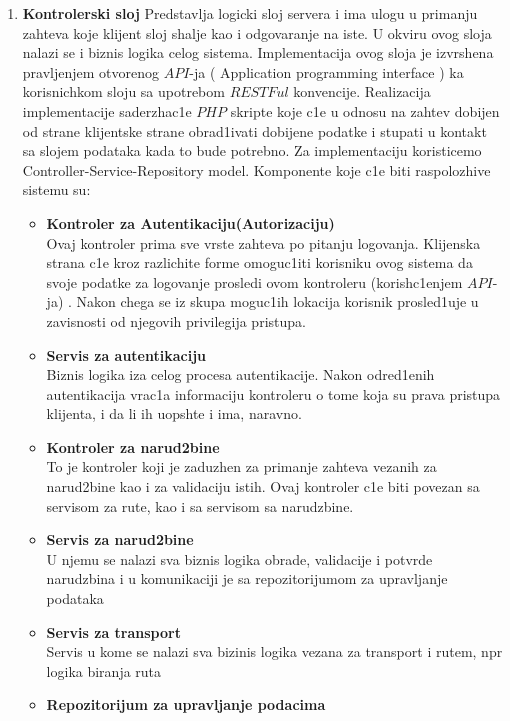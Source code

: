 \begin{enumerate}
    \item {\textbf{Kontrolerski sloj}}
			Predstavlja logicki sloj servera i ima ulogu u primanju zahteva koje klijent sloj shalje kao i odgovaranje na iste. U okviru ovog sloja nalazi se i biznis logika celog sistema.  Implementacija ovog sloja je izvrshena pravljenjem otvorenog $API$-ja ( \selectfont Application programming interface  \selectfont ) ka korisnichkom sloju sa upotrebom $RESTFul$ konvencije. Realizacija implementacije saderzhac1e $PHP$ skripte koje c1e u odnosu na zahtev dobijen od strane klijentske strane obrad1ivati dobijene podatke i stupati u kontakt sa slojem podataka kada to bude potrebno. Za implementaciju koristicemo  \selectfont Controller-Service-Repository \selectfont  model.  Komponente koje c1e biti raspolozhive sistemu su:
			\begin{itemize}
				\item {\textbf{Kontroler za Autentikaciju(Autorizaciju)} \\
						Ovaj kontroler prima sve vrste zahteva po pitanju logovanja. Klijenska strana c1e kroz razlichite forme omoguc1iti korisniku ovog sistema da svoje podatke za logovanje prosledi ovom kontroleru (korish\-c1enjem $API$-ja) . Nakon chega se iz skupa moguc1ih lokacija korisnik prosled1uje u zavisnosti od njegovih privilegija pristupa.}
				\item{\textbf{Servis za autentikaciju}\\
				Biznis logika iza celog procesa autentikacije. Nakon odred1enih autentikacija vrac1a informaciju kontroleru o tome koja su prava pristupa klijenta, i da li ih uopshte i ima, naravno.}
				\item{\textbf{Kontroler za narud2bine}\\
					To je kontroler koji je zaduzhen za primanje zahteva vezanih za narud2bine kao i za validaciju istih.  Ovaj kontroler c1e biti povezan sa servisom za rute, kao i sa servisom sa narudzbine. }
				\item{\textbf{Servis za narud2bine} \\
					U njemu se nalazi sva biznis logika obrade, validacije i potvrde narudzbina i u komunikaciji je sa repozitorijumom za upravljanje podataka}
				\item{\textbf{Servis za transport} \\
					Servis u kome se nalazi sva bizinis logika vezana za transport i rutem, npr logika biranja ruta}
				\item{\textbf{Repozitorijum za upravljanje podacima}
}
\end{itemize}
\end{enumerate}
